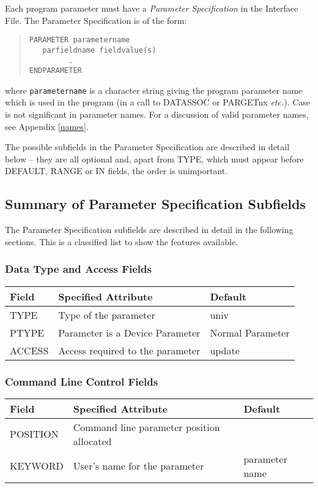 \documentclass[twoside,11pt]{article}
\newcommand{\xlabel}[1]{}
\renewcommand{\_}{\texttt{\symbol{95}}}
\begin{document}
Each program parameter must have a {\em Parameter Specification} in the
Interface File. The Parameter Specification is of the form: 
\begin{quote} \begin{verbatim}
PARAMETER parametername
   parfieldname fieldvalue(s)
         .
ENDPARAMETER
\end{verbatim} \end{quote}
where \texttt{parametername} is a character string giving the program parameter 
name which is used in the program (in a call to DAT\_ASSOC or 
PAR\_GETnx {\em etc.}). Case is not significant in parameter names.
For a discussion of valid parameter names, see Appendix \ref{names}.

The possible subfields in the Parameter Specification are described in detail
below -- they are all optional and, apart from
TYPE, which must appear before DEFAULT, RANGE or IN fields, the order
is unimportant.

\subsection{Summary of Parameter Specification Subfields
\xlabel{summary_of_parameter_specification_subfields}}

The Parameter Specification subfields are described in detail in the following
sections. This is a classified list to show the features available.

\subsubsection*{Data Type and Access Fields}
\begin{center}
\begin{tabular}{|l|l|l|} \hline
Field & Specified Attribute & Default\\
\hline
TYPE & Type of the parameter & univ \\
PTYPE & Parameter is a Device Parameter & Normal Parameter \\
ACCESS & Access required to the parameter & update \\
\hline
\end{tabular}
\end{center}

\subsubsection*{Command Line Control Fields}
\begin{center}
\begin{tabular}{|l|l|l|} \hline
Field & Specified Attribute & Default\\
\hline
POSITION & Command line parameter position allocated & \\
KEYWORD & User's name for the parameter & parameter
name \\
\hline
\end{tabular}
\end{center}
\end{document}
